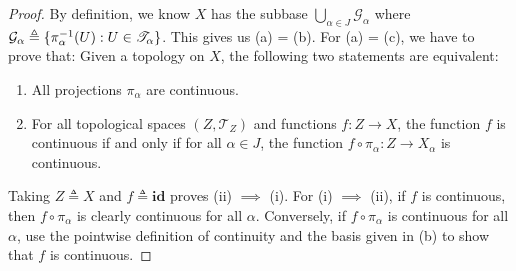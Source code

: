 \documentclass{report}
\begin{document}
\begin{proof}
By definition, we know $X$ has the subbase $\bigcup_{\alpha \in J} \mathcal{G}_\alpha$ where $\mathcal{G}_\alpha \triangleq \{ \pi_\alpha^{-1}(U) : U \in \mathscr{T}_\alpha \}$. This gives us (a) = (b). For (a) = (c), we have to prove that: Given a topology on $X$, the following two statements are equivalent:
\begin{enumerate}[label=(\roman*)] 
    \item All projections $\pi_\alpha$ are continuous.
    \item For all topological spaces $(Z, \mathscr{T}_Z)$ and functions $f : Z \to X$, the function $f$ is continuous if and only if for all $\alpha \in J$, the function $f \circ \pi_\alpha : Z \to X_\alpha$ is continuous.
\end{enumerate}
Taking $Z \triangleq X$ and $f \triangleq \textbf{id}$ proves (ii) $\implies$ (i). For (i) $\implies$ (ii), if $f$ is continuous, then $f \circ \pi_\alpha$ is clearly continuous for all $\alpha$. Conversely, if $f \circ \pi_\alpha$ is continuous for all $\alpha$, use the pointwise definition of continuity and the basis given in (b) to show that $f$ is continuous.
\end{proof}
\end{document}
